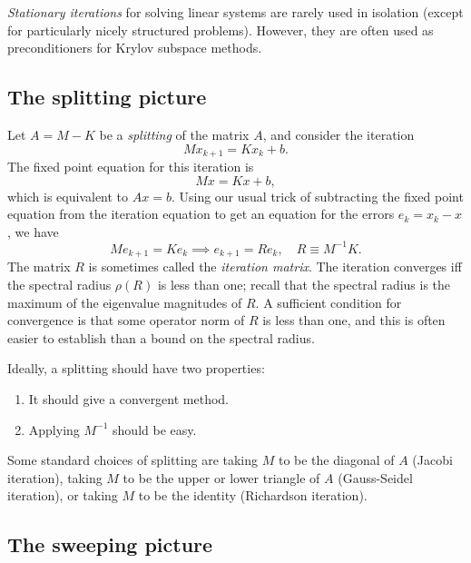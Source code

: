 \documentclass[12pt, leqno]{article}
\begin{document}
{\em Stationary iterations} for solving linear systems are rarely used
in isolation (except for particularly nicely structured problems).
However, they are often used as preconditioners for Krylov subspace
methods.

\subsection{The splitting picture}

Let $A = M-K$ be a {\em splitting} of the matrix $A$, and consider
the iteration
\[
  M x_{k+1} = K x_k + b.
\]
The fixed point equation for this iteration is
\[
  Mx = Kx + b,
\]
which is equivalent to $Ax = b$.  Using our usual trick of subtracting
the fixed point equation from the iteration equation to get an
equation for the errors $e_k = x_k-x$, we have
\[
  M e_{k+1} = K e_k \implies e_{k+1} = R e_k, \quad R \equiv M^{-1} K.
\]
The matrix $R$ is sometimes called the {\em iteration matrix}.  The
iteration converges iff the spectral radius $\rho(R)$ is less than one;
recall that the spectral radius is the maximum of the eigenvalue
magnitudes of $R$.  A sufficient condition for convergence is that
some operator norm of $R$ is less than one, and this is often easier
to establish than a bound on the spectral radius.

Ideally, a splitting should have two properties:
\begin{enumerate}
\item It should give a convergent method.
\item Applying $M^{-1}$ should be easy.
\end{enumerate}
Some standard choices of splitting are taking $M$ to be the diagonal
of $A$ (Jacobi iteration), taking $M$ to be the upper or lower
triangle of $A$ (Gauss-Seidel iteration), or taking $M$ to be
the identity (Richardson iteration).

\subsection{The sweeping picture}
\end{document}
